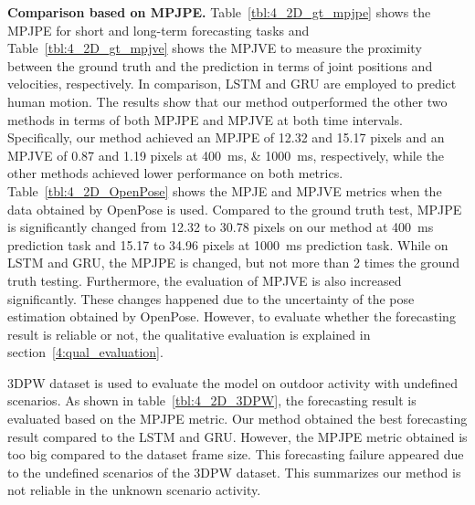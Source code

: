 \textbf{Comparison based on MPJPE.}
Table~\ref{tbl:4_2D_gt_mpjpe} shows the MPJPE for short and long-term forecasting tasks and Table~\ref{tbl:4_2D_gt_mpjve} shows the MPJVE to measure the proximity between the ground truth and the prediction in terms of joint positions and velocities, respectively. In comparison, LSTM\cite{lstm} and GRU\cite{gru} are employed to predict human motion. The results show that our method outperformed the other two methods in terms of both MPJPE and MPJVE at both time intervals. Specifically, our method achieved an MPJPE of 12.32 and 15.17 pixels and an MPJVE of 0.87 and 1.19 pixels at \qtylist{400; 1000}{\milli\second}, respectively, while the other methods achieved lower performance on both metrics. Table~\ref{tbl:4_2D_OpenPose} shows the MPJE and MPJVE metrics when the data obtained by OpenPose is used. Compared to the ground truth test, MPJPE is significantly changed from 12.32 to 30.78 pixels on our method at \SI{400}{\milli\second} prediction task and 15.17 to 34.96 pixels at \SI{1000}{\milli\second} prediction task. While on LSTM and GRU, the MPJPE is changed, but not more than 2 times the ground truth testing.
Furthermore, the evaluation of MPJVE is also increased significantly. These changes happened due to the uncertainty of the pose estimation obtained by OpenPose. However, to evaluate whether the forecasting result is reliable or not, the qualitative evaluation is explained in section~\ref{4:qual_evaluation}.

3DPW dataset is used to evaluate the model on outdoor activity with undefined scenarios. As shown in table~\ref{tbl:4_2D_3DPW}, the forecasting result is evaluated based on the MPJPE metric. Our method obtained the best forecasting result compared to the LSTM and GRU. However, the MPJPE metric obtained is too big compared to the dataset frame size. This forecasting failure appeared due to the undefined scenarios of the 3DPW dataset. This summarizes our method is not reliable in the unknown scenario activity.

